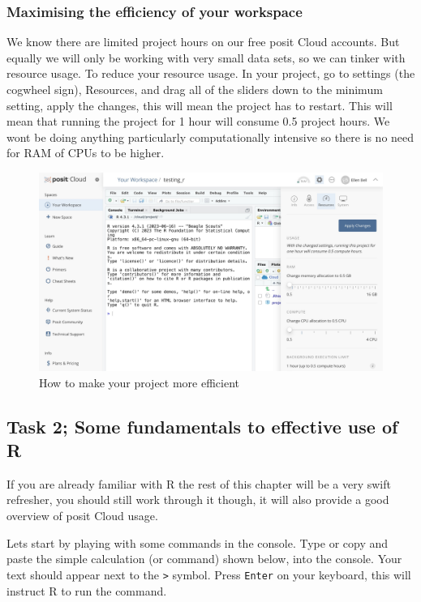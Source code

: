 \documentclass[
]{book}
\begin{document}
\subsubsection{Maximising the efficiency of your workspace}\label{efficiency}

We know there are limited project hours on our free posit Cloud accounts. But equally we will only be working with very small data sets, so we can tinker with resource usage. To reduce your resource usage. In your project, go to settings (the cogwheel sign), Resources, and drag all of the sliders down to the minimum setting, apply the changes, this will mean the project has to restart. This will mean that running the project for 1 hour will consume 0.5 project hours. We wont be doing anything particularly computationally intensive so there is no need for RAM of CPUs to be higher.

\begin{figure}
\includegraphics[width=0.9\linewidth]{figures/posit5} \caption{How to make your project more efficient}\label{fig:unnamed-chunk-5}
\end{figure}

\subsection{Task 2; Some fundamentals to effective use of R}\label{c2}

If you are already familiar with R the rest of this chapter will be a very swift refresher, you should still work through it though, it will also provide a good overview of posit Cloud usage.

Lets start by playing with some commands in the console. Type or copy and paste the simple calculation (or command) shown below, into the console. Your text should appear next to the \texttt{\textgreater{}} symbol. Press \texttt{Enter} on your keyboard, this will instruct R to run the command.
\end{document}
